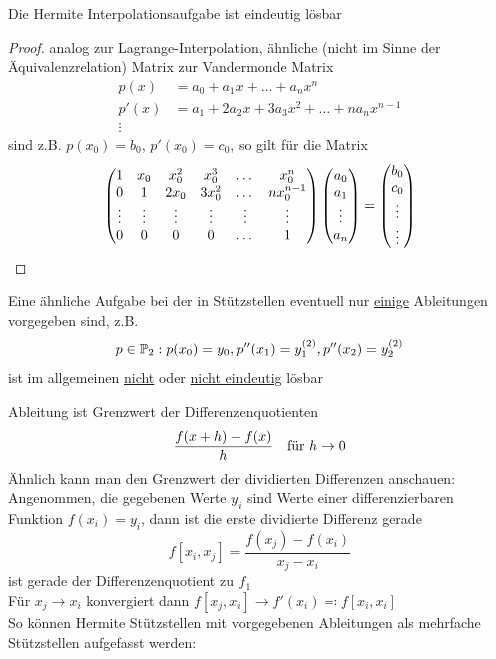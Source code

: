 \begin{theorem}
    Die Hermite Interpolationsaufgabe ist eindeutig lösbar
\end{theorem}
\begin{proof}
    analog zur Lagrange-Interpolation, ähnliche (nicht im Sinne der Äquivalenzrelation) Matrix zur Vandermonde Matrix
    \begin{align*}
        p(x) &= a_0 + a_1x + \dots + a_nx^n\\
        p'(x) &= a_1+2a_2x+3a_3x^2+\dots+na_nx^{n-1}\\
        \vdots
    \end{align*}
    sind z.B. $p(x_0) = b_0$, $p'(x_0)=c_0$, so gilt für die Matrix \[
        \begin{pmatrix}
            1&x_0&x_0^2&x_0^3&\dots&x_0^n \\
            0&1&2x_0&3x_0^2&\dots&nx_0^{n-1}\\
            \vdots&\vdots&\vdots&\vdots & \vdots&\vdots\\
            0&0&0&0&\dots& 1
        \end{pmatrix}\begin{pmatrix}
        a_0\\a_1\\ \vdots\\a_n
        \end{pmatrix}
        = \begin{pmatrix}b_0\\c_0\\\vdots\\\vdots\end{pmatrix}
    \]
\end{proof}
\begin{remark}
    Eine ähnliche Aufgabe bei der in Stützstellen eventuell nur \underline{einige} Ableitungen vorgegeben sind, z.B. \[
    p\in\mathbb{P}_2: p(x_0) = y_0, p''(x_1) = y_1^{(2)}, p''(x_2)=y_2^{(2)}
    \] 
    ist im allgemeinen \underline{nicht} oder \underline{nicht eindeutig} lösbar
\end{remark}
 Ableitung ist Grenzwert der Differenzenquotienten \[
    \frac{f(x+h) - f(x)}{h} \hspace{1em} \text{für }h\to 0
 \]
Ähnlich kann man den Grenzwert der dividierten Differenzen anschauen:\\
Angenommen, die gegebenen Werte $y_i$ sind Werte einer differenzierbaren Funktion $f(x_i) = y_i$, dann ist die erste 
dividierte Differenz gerade \[
    f[x_i, x_j] = \frac{f(x_j) - f(x_i)}{x_j-x_i} 
\]
ist gerade der Differenzenquotient zu $f_1$\\
Für $x_j\to x_i$ konvergiert dann $f[x_j,x_i]\to f'(x_i)\eqqcolon f[x_i,x_i]$\\
So können Hermite Stützstellen mit vorgegebenen Ableitungen als mehrfache Stützstellen aufgefasst werden:\\

